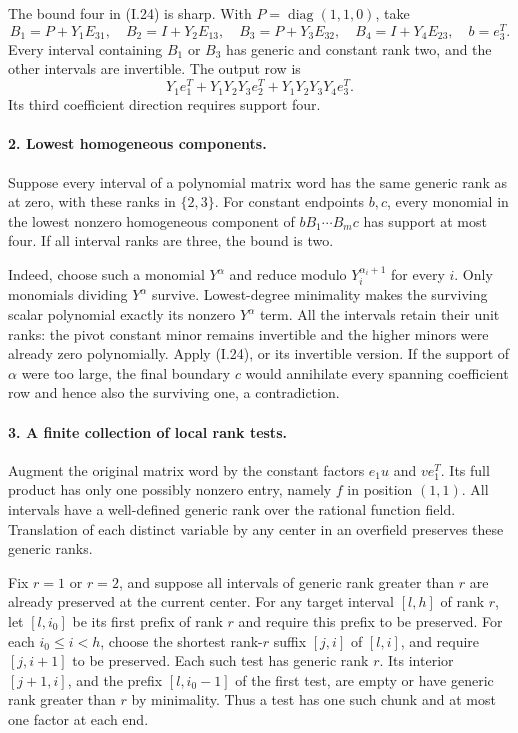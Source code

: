 \documentclass[11pt,a4paper]{article}
\theoremstyle{definition}\newtheorem{definition}{Definition}
\begin{document}
The bound four in (I.24) is sharp.  With $P=\operatorname{diag}(1,1,0)$,
take
\[
 B_1=P+Y_1E_{31},\quad B_2=I+Y_2E_{13},\quad
 B_3=P+Y_3E_{32},\quad B_4=I+Y_4E_{23},\quad b=e_3^T.
\]
Every interval containing $B_1$ or $B_3$ has generic and constant
rank two, and the other intervals are invertible.  The output row is
\[
 Y_1e_1^T+Y_1Y_2Y_3e_2^T+Y_1Y_2Y_3Y_4e_3^T.
\]
Its third coefficient direction requires support four.

\paragraph{2. Lowest homogeneous components.}
Suppose every interval of a polynomial matrix word has the same
generic rank as at zero, with these ranks in $\{2,3\}$.  For constant
endpoints $b,c$, every monomial in the lowest nonzero homogeneous
component of $bB_1\cdots B_mc$ has support at most four.  If all
interval ranks are three, the bound is two.

Indeed, choose such a monomial $Y^\alpha$ and reduce modulo
$Y_i^{\alpha_i+1}$ for every $i$.  Only monomials dividing
$Y^\alpha$ survive.  Lowest-degree minimality makes the surviving
scalar polynomial exactly its nonzero $Y^\alpha$ term.  All the
intervals retain their unit ranks: the pivot constant minor remains
invertible and the higher minors were already zero polynomially.
Apply (I.24), or its invertible version.  If the support of $\alpha$
were too large, the final boundary $c$ would annihilate every
spanning coefficient row and hence also the surviving one, a
contradiction.

\paragraph{3. A finite collection of local rank tests.}
Augment the original matrix word by the constant factors $e_1u$
and $ve_1^T$.  Its full product has only one possibly nonzero entry,
namely $f$ in position $(1,1)$.  All intervals have a well-defined
generic rank over the rational function field.  Translation of
each distinct variable by any center in an overfield preserves
these generic ranks.

Fix $r=1$ or $r=2$, and suppose all intervals of generic rank
greater than $r$ are already preserved at the current center.
For any target interval $[l,h]$ of rank $r$, let $[l,i_0]$ be its
first prefix of rank $r$ and require this prefix to be preserved.
For each $i_0\le i<h$, choose the shortest rank-$r$ suffix $[j,i]$
of $[l,i]$, and require $[j,i+1]$ to be preserved.  Each such test
has generic rank $r$.  Its interior $[j+1,i]$, and the prefix
$[l,i_0-1]$ of the first test, are empty or have generic rank
greater than $r$ by minimality.  Thus a test has one such chunk
and at most one factor at each end.
\end{document}
